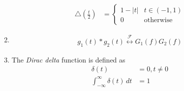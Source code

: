 \documentclass[journal,12pt,onecolumn]{IEEEtran}
\renewcommand\thesection{\arabic{section}}
\renewcommand\thesubsection{\thesection.\arabic{subsection}}
\providecommand{\brak}[1]{\ensuremath{\left(#1\right)}}
\theoremstyle{remark}
\providecommand{\abs}[1]{\left\vert#1\right\vert}
\providecommand{\system}[1]{\overset{\mathcal{#1}}{ \longleftrightarrow}}
\numberwithin{equation}{section}
\begin{document}
\begin{enumerate}[label=\arabic*.,ref=\thesubsection.\theenumi]
\begin{align}
		\triangle\brak{\frac{t}{2}} &= 
		\begin{cases}
			1 -\abs{t}& t \in \brak{-1, 1}
			\\
			0 & \text{otherwise}
		\end{cases}
	\end{align}
\item 
	\begin{align}
		g_1(t) * g_2(t) \system{F} G_1(f)G_2(f)
	\end{align}
\item The {\em Dirac delta} function is defined as 
	\begin{align}
		\delta(t) &= 0, t \ne 0 
		\\
		\int_{-\infty}^{\infty} \delta(t)\,dt &= 1
	\end{align}
 \end{enumerate}
\end{document}
